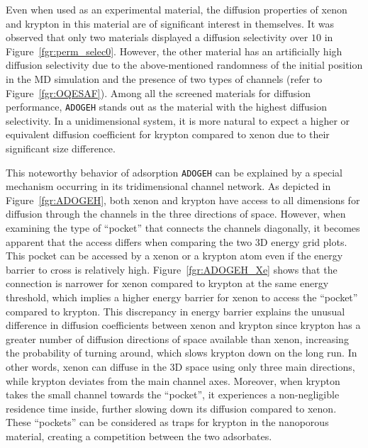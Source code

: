 \documentclass[main]{subfiles}
\begin{document}
Even when used as an experimental material, the diffusion properties of xenon and krypton in this material are of significant interest in themselves. It was observed that only two materials displayed a diffusion selectivity over $10$ in Figure~\ref{fgr:perm_selec0}. However, the other material has an artificially high diffusion selectivity due to the above-mentioned randomness of the initial position in the MD simulation and the presence of two types of channels (refer to Figure~\ref{fgr:OQESAF}). Among all the screened materials for diffusion performance, \texttt{ADOGEH} stands out as the material with the highest diffusion selectivity. In a unidimensional system, it is more natural to expect a higher or equivalent diffusion coefficient for krypton compared to xenon due to their significant size difference.

This noteworthy behavior of adsorption  \texttt{ADOGEH} can be explained by a special mechanism occurring in its tridimensional channel network. As depicted in Figure~\ref{fgr:ADOGEH}, both xenon and krypton have access to all dimensions for diffusion through the channels in the three directions of space. However, when examining the type of ``pocket'' that connects the channels diagonally, it becomes apparent that the access differs when comparing the two 3D energy grid plots. This pocket can be accessed by a xenon or a krypton atom even if the energy barrier to cross is relatively high. Figure~\ref{fgr:ADOGEH_Xe} shows that the connection is narrower for xenon compared to krypton at the same energy threshold, which implies a higher energy barrier for xenon to access the ``pocket'' compared to krypton. This discrepancy in energy barrier explains the unusual difference in diffusion coefficients between xenon and krypton since krypton has a greater number of diffusion directions of space available than xenon, increasing the probability of turning around, which slows krypton down on the long run. In other words, xenon can diffuse in the 3D space using only three main directions, while krypton deviates from the main channel axes. Moreover, when krypton takes the small channel towards the ``pocket'', it experiences a non-negligible residence time inside, further slowing down its diffusion compared to xenon. These ``pockets'' can be considered as traps for krypton in the nanoporous material, creating a competition between the two adsorbates. 
\end{document}
